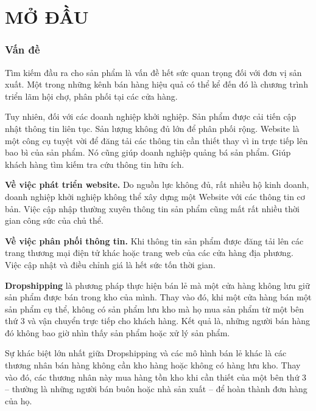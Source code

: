 \documentclass[11pt]{report}
\begin{document}
	
	
	
	\setcounter{page}{1}
	\chapter*{MỞ ĐẦU}
	\fontsize{13px}{13px}\selectfont\justifying
	
	\subsection*{Vấn đề}
	
	Tìm kiếm đầu ra cho sản phẩm là vấn đề hết sức quan trọng đối với đơn vị sản xuất. Một trong những kênh bán hàng hiệu quả có thể kể đến đó là chương trình triển lãm hội chợ, phân phối tại các cửa hàng.
	
	Tuy nhiên, đối với các doanh nghiệp khởi nghiệp. Sản phẩm được cải tiến cập nhật thông tin liên tục. Sản lượng không đủ lớn để phân phối rộng. Website là một công cụ tuyệt vời để đăng tải các thông tin cần thiết thay vì in trực tiếp lên bao bì của sản phẩm. Nó cũng giúp doanh nghiệp quảng bá sản phẩm. Giúp khách hàng tìm kiếm tra cứu thông tin hữu ích.
	
	\textbf{Về việc phát triển website.}\label{pro:1} Do nguồn lực không đủ, rất nhiều hộ kinh doanh, doanh nghiệp khởi nghiệp không thể xây dựng một Website với các thông tin cơ bản. Việc cập nhập thường xuyên thông tin sản phẩm cũng mất rất nhiều thời gian công sức của chủ thể.
	
	\textbf{Về việc phân phối thông tin.}\label{pro:2} Khi thông tin sản phẩm được đăng tải  lên các trang thương mại điện tử khác hoặc trang web của các cửa hàng địa phương. Việc cập nhật và điều chỉnh giá là hết sức tốn thời gian.
	
	\textbf{Dropshipping} là phương pháp thực hiện bán lẻ mà một cửa hàng không lưu giữ sản phẩm được bán trong kho của mình. Thay vào đó, khi một cửa hàng bán một sản phẩm cụ thể, không có sản phẩm lưu kho mà họ mua sản phẩm từ một bên thứ 3 và vận chuyển trực tiếp cho khách hàng. Kết quả là, những người bán hàng đó không bao giờ nhìn thấy sản phẩm hoặc xử lý sản phẩm.
	
	Sự khác biệt lớn nhất giữa Dropshipping và các mô hình bán lẻ khác là các thương nhân bán hàng không cần kho hàng hoặc không có hàng lưu kho. Thay vào đó, các thương nhân này mua hàng tồn kho khi cần thiết của một bên thứ 3 – thường là những người bán buôn hoặc nhà sản xuất – để hoàn thành đơn hàng của họ.
	
\end{document}
